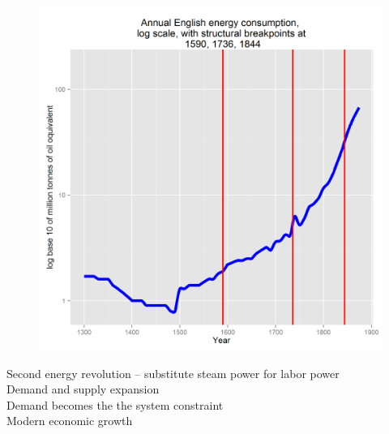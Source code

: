 \documentclass[final]{beamer}
\begin{document}
\begin{frame}
\begin{figure}[p!]
{		\mbox{\includegraphics[height=0.5\textheight]{energyLog1}}
		}
		\end{figure} \vspace*{-0.4in}
Second energy revolution -- substitute steam power for labor power\\
Demand and supply expansion\\
Demand becomes the the system constraint\\
Modern economic growth\\
\end{frame}
\end{document}
